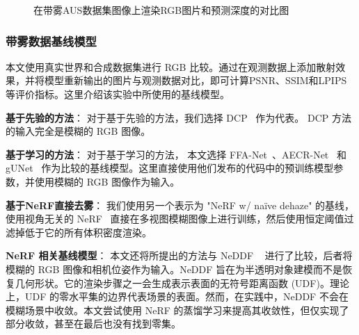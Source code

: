\begin{figure}[p]
    \centering
    \caption{在带雾AUS数据集图像上渲染RGB图片和预测深度的对比图}
    \label{fig:dehazenerf-synt-rgbd}
\end{figure}








\subsubsection{带雾数据基线模型}



本文使用真实世界和合成数据集进行 RGB 比较。通过在观测数据上添加散射效果，并将模型重新输出的图片与观测数据对比，即可计算PSNR、SSIM和LPIPS等评价指标。这里介绍该实验中所使用的基线模型。

\noindent\textbf{基于先验的方法}：
对于基于先验的方法，我们选择 DCP~\cite{kaiming_he_single_2009} 作为代表。 DCP 方法的输入完全是模糊的 RGB 图像。

\noindent\textbf{基于学习的方法}：
对于基于学习的方法， 本文选择 FFA-Net~\cite{qin_ffa-net_2020}、AECR-Net~\cite{wu_contrastive_2021} 和 gUNet ~\cite{song_rethinking_2022}作为比较的基线模型。这里直接使用他们发布的代码中的预训练模型参数，并使用模糊的 RGB 图像作为输入。

\noindent\textbf{基于NeRF直接去雾}：
我们使用另一个表示为 "NeRF w/ na\"ive dehaze" 的基线，使用视角无关的 NeRF~\cite{mildenhall_nerf_2020} 直接在多视图模糊图像上进行训练，然后使用恒定阈值过滤掉低于它的所有体积密度渲染。

\noindent\textbf{NeRF 相关基线模型}：
本文还将所提出的方法与 NeDDF ~\cite{ueda_neural_2022} 进行了比较，后者将模糊的 RGB 图像和相机位姿作为输入。NeDDF 旨在为半透明对象建模而不是恢复几何形状。它的渲染步骤之一会生成表示表面的无符号距离函数 (UDF)。理论上，UDF 的零水平集的边界代表场景的表面。然而，在实践中，NeDDF 不会在模糊场景中收敛。本文尝试使用 NeRF 的蒸馏学习来提高其收敛性，但仅实现了部分收敛，甚至在最后也没有找到零集。

